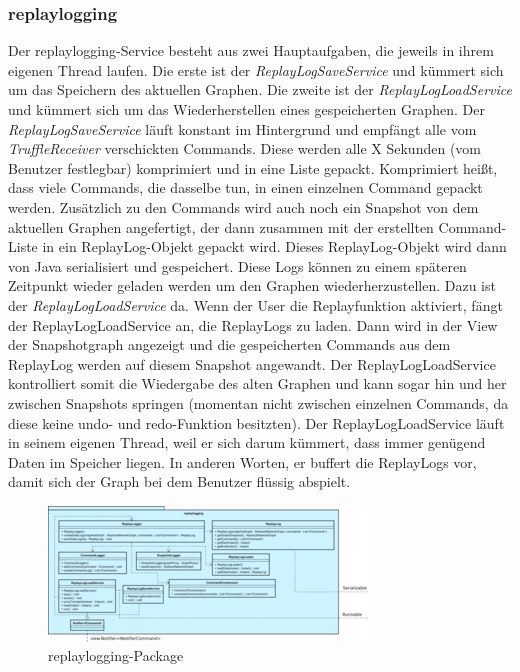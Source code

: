     \subsubsection{replaylogging}
    \label{subsubsec:replaylogging}

    Der replaylogging-Service besteht aus zwei Hauptaufgaben, die jeweils in ihrem eigenen Thread laufen.
    Die erste ist der \textit{ReplayLogSaveService} und kümmert sich um das Speichern des aktuellen
    Graphen. Die zweite ist der \textit{ReplayLogLoadService} und kümmert sich um das
    Wiederherstellen eines gespeicherten Graphen.
    \newline
    \newline
    Der \textit{ReplayLogSaveService} läuft konstant im Hintergrund und empfängt alle
    vom \textit{TruffleReceiver} verschickten Commands. Diese werden alle X
    Sekunden (vom Benutzer festlegbar) komprimiert und in eine Liste gepackt.
    Komprimiert heißt, dass viele Commands, die dasselbe tun, in einen einzelnen Command
    gepackt werden. Zusätzlich zu den Commands wird auch noch ein Snapshot
    von dem aktuellen Graphen angefertigt, der dann zusammen mit der erstellten
    Command-Liste in ein ReplayLog-Objekt gepackt wird. Dieses
    ReplayLog-Objekt wird dann von Java serialisiert und gespeichert.
    \newline
    \newline
    Diese Logs können zu einem späteren Zeitpunkt wieder geladen werden um den
    Graphen wiederherzustellen. Dazu ist der \textit{ReplayLogLoadService} da. Wenn
    der User die Replayfunktion aktiviert, fängt der ReplayLogLoadService an, die
    ReplayLogs zu laden. Dann wird in der View der Snapshotgraph angezeigt
    und die gespeicherten Commands aus dem ReplayLog werden auf
    diesem Snapshot angewandt. Der ReplayLogLoadService kontrolliert somit die
    Wiedergabe des alten Graphen und kann sogar hin und her zwischen Snapshots
    springen (momentan nicht zwischen einzelnen Commands, da diese keine undo-
    und redo-Funktion besitzten).
    \newline
    \newline
    Der ReplayLogLoadService läuft in seinem eigenen Thread, weil er sich darum
    kümmert, dass immer genügend Daten im Speicher liegen. In anderen Worten, er
    buffert die ReplayLogs vor, damit sich der Graph bei dem Benutzer flüssig
    abspielt.

    \clearpage
    \begin{figure}
      \centering
      \includegraphics[width=\textwidth]{../diagramimages/replaylogging.png}
      \caption{replaylogging-Package}
    \end{figure}
    \clearpage

